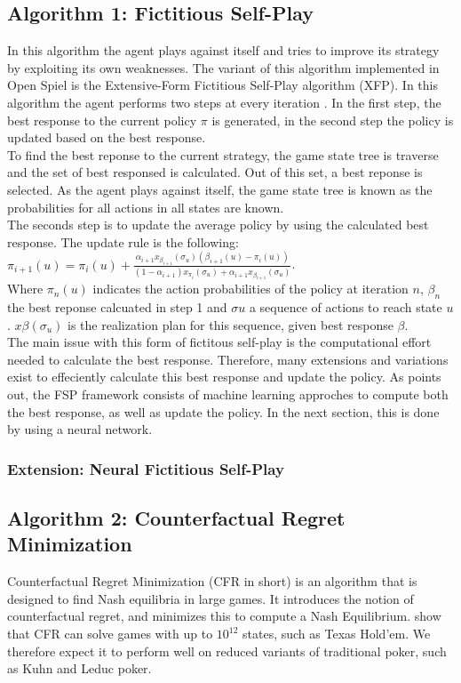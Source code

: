 \documentclass[10pt,a4paper]{article}
\begin{document}
\subsection{Algorithm 1: Fictitious Self-Play}
In this algorithm the agent plays against itself and tries to improve its strategy by exploiting its own weaknesses. The variant of this algorithm implemented in Open Spiel is the Extensive-Form Fictitious Self-Play algorithm (XFP). In this algorithm the agent performs two steps at every iteration \citep{fsp-ext}. In the first step, the best response to the current policy $\pi$ is generated, in the second step the policy is updated based on the best response.\\
To find the best reponse to the current strategy, the game state tree is traverse and the set of best responsed is calculated. Out of this set, a best reponse is selected. As the agent plays against itself, the game state tree is known as the probabilities for all actions in all states are known.\\
The seconds step is to update the average policy by using the calculated best response. The update rule is the following:
\begin{math}
\pi_{i+1}(u) = \pi_{i}(u) + \frac{\alpha_{i+1}x_{\beta_{i+1}}(\sigma_{u})(\beta_{i+1}(u) - \pi_i(u))}{(1-\alpha_{i+1})x_{\pi_i}(\sigma_{u}) + \alpha_{i+1}x_{\beta_{i+1}}(\sigma_u)}
\end{math}.\\
Where $\pi_n(u)$ indicates the action probabilities of the policy at iteration $n$, $\beta_n$ the best reponse calcuated in step 1 and $\sigma{u}$ a sequence of actions to reach state $u$. $x{\beta}(\sigma_u)$ is the realization plan for this sequence, given best response $\beta$.\\
The main issue with this form of fictitous self-play is the computational effort needed to calculate the best response. Therefore, many extensions and variations exist to effeciently calculate this best response and update the policy. As \cite{fsp-ext} points out, the FSP framework consists of machine learning approches to compute both the best response, as well as update the policy. 
In the next section, this is done by using a neural network.
\subsubsection{Extension: Neural Fictitious Self-Play}
\subsection{Algorithm 2: Counterfactual Regret Minimization}
Counterfactual Regret Minimization (CFR in short) is an algorithm that is designed to find Nash equilibria in large games. It introduces the notion of counterfactual regret, and minimizes this to compute a Nash Equilibrium. \citeauthor{cfr} \citep{cfr} show that CFR can solve games with up to $10^{12}$ states, such as Texas Hold'em. We therefore expect it to perform well on reduced variants of traditional poker, such as Kuhn and Leduc poker.\\
\end{document}
